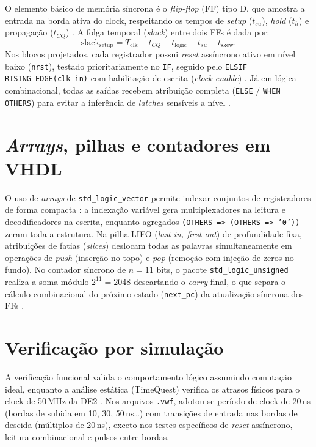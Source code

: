 \documentclass[
	12pt,				%
	oneside,			%
	a4paper,			%
	sumario = tradicional,
	english,			%
	brazilian			%
	]{abntex2}
\begin{document}
O elemento básico de memória síncrona é o \textit{flip-flop} (FF) tipo D, que amostra a entrada na borda ativa do clock, respeitando os tempos de \textit{setup} ($t_{su}$), \textit{hold} ($t_h$) e propagação ($t_{CQ}$) \cite{aula1}. A folga temporal (\textit{slack}) entre dois FFs é dada por:
\begin{equation}
  \text{slack}_{\text{setup}} = T_{\text{clk}} - t_{CQ} - t_{\text{logic}} - t_{su} - t_{\text{skew}}.
  \label{eq:slack}
\end{equation}
Nos blocos projetados, cada registrador possui \textit{reset} assíncrono ativo em nível baixo (\texttt{nrst}), testado prioritariamente no \texttt{IF}, seguido pelo \texttt{ELSIF RISING\_EDGE(clk\_in)} com habilitação de escrita (\textit{clock enable}) \cite{aula8}. Já em lógica combinacional, todas as saídas recebem atribuição completa (\texttt{ELSE} / \texttt{WHEN OTHERS}) para evitar a inferência de \textit{latches} sensíveis a nível \cite{aula7}.

\section{\textit{Arrays}, pilhas e contadores em VHDL}

O uso de \textit{arrays} de \texttt{std\_logic\_vector} permite indexar conjuntos de registradores de forma compacta \cite{aula6}: a indexação variável gera multiplexadores na leitura e decodificadores na escrita, enquanto agregados \texttt{(OTHERS => (OTHERS => '0'))} zeram toda a estrutura. Na pilha LIFO (\textit{last in, first out}) de profundidade fixa, atribuições de fatias (\textit{slices}) deslocam todas as palavras simultaneamente em operações de \textit{push} (inserção no topo) e \textit{pop} (remoção com injeção de zeros no fundo). No contador síncrono de $n=11$ bits, o pacote \texttt{std\_logic\_unsigned} realiza a soma módulo $2^{11}=2048$ descartando o \textit{carry} final, o que separa o cálculo combinacional do próximo estado (\texttt{next\_pc}) da atualização síncrona dos FFs \cite{aula6}.

\section{Verificação por simulação}

A verificação funcional valida o comportamento lógico assumindo comutação ideal, enquanto a análise estática (TimeQuest) verifica os atrasos físicos para o clock de 50\,MHz da DE2 \cite{aula2}. Nos arquivos \texttt{.vwf}, adotou-se período de clock de 20\,ns (bordas de subida em 10, 30, 50\,ns\dots) com transições de entrada nas bordas de descida (múltiplos de 20\,ns), exceto nos testes específicos de \textit{reset} assíncrono, leitura combinacional e pulsos entre bordas.
\end{document}
